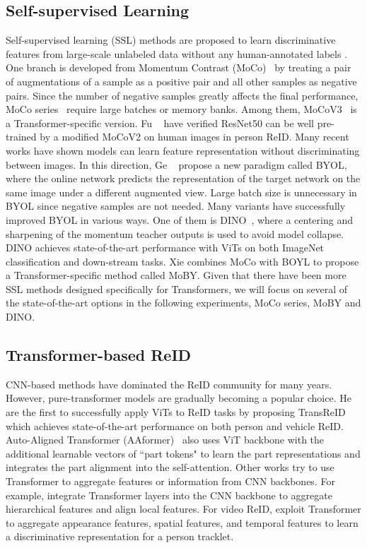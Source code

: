 \documentclass[10pt,twocolumn,letterpaper]{article}
\begin{document}
\subsection{Self-supervised Learning}
Self-supervised learning (SSL) methods are proposed to learn discriminative features from large-scale unlabeled data without any human-annotated labels \cite{jing2020self}. 
One branch is developed from Momentum Contrast (MoCo)~\cite{moco_v2} by treating a pair of augmentations of a sample as a positive pair and all other samples as negative pairs. Since the number of negative samples greatly affects the final performance, MoCo series~\cite{chen2021mocov3, moco_v2} require large batches or memory banks. Among them, MoCoV3~\cite{chen2021mocov3} is a Transformer-specific version. Fu \etal~\cite{fu2021unsupervised} have verified ResNet50 can be well pre-trained by a modified MoCoV2 on human images in person ReID. Many recent works have shown models can learn feature representation without discriminating between images. In this direction, Ge \etal~\cite{BYOL} propose a new paradigm called BYOL, where the online network predicts the representation of the target network on the same image under a different augmented view. Large batch size is unnecessary in BYOL since negative samples are not needed. Many variants have successfully improved BYOL in various ways. One of them is  DINO~\cite{dino}, where a centering and sharpening of the momentum teacher outputs is used to avoid model collapse. DINO achieves state-of-the-art performance with ViTs on both ImageNet classification and down-stream tasks. Xie \etal combines MoCo with BOYL to propose a Transformer-specific method called MoBY. Given that there have been more SSL methods designed specifically for Transformers, we will focus on several of the state-of-the-art options in the following experiments, \eg MoCo series, MoBY and DINO.

\subsection{Transformer-based ReID}

CNN-based methods have dominated the ReID community for many years. However, pure-transformer models are gradually becoming a popular choice. He \etal~\cite{he2021transreid} are the first to successfully apply ViTs to ReID tasks by proposing TransReID which achieves state-of-the-art performance on both person and vehicle ReID. Auto-Aligned Transformer (AAformer)~\cite{zhu2021aaformer} also uses ViT backbone with the additional learnable vectors of ``part tokens" to learn the part representations and integrates the part alignment into the self-attention. Other works try to use Transformer to aggregate features or information from CNN backbones. For example, \cite{zhang2021hat,shen2021git,PAT} integrate Transformer layers into the CNN backbone to aggregate hierarchical features and align local features. For video ReID, \cite{zhang2021spatiotemporal, liu2021video} exploit Transformer to aggregate appearance features, spatial features, and temporal features to learn a discriminative representation for a person tracklet. 
\end{document}
